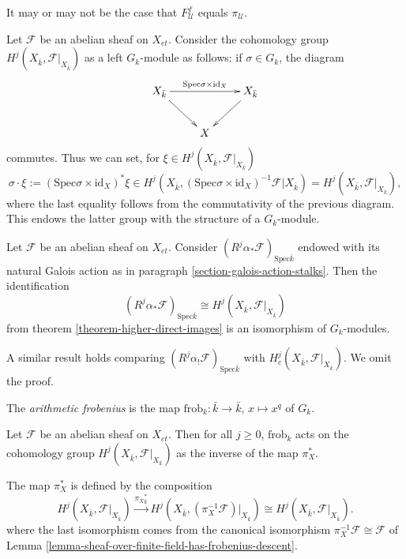 \begin{remark}
\label{remark-may-be-confusing}
It may or may not be the case that $F^f_\mathcal{U}$ equals $\pi_\mathcal{U}$.
\end{remark}

\noindent
Let $\mathcal{F}$ be an abelian sheaf on $X_{et}$. Consider the cohomology
group $H^j (X_{\bar k}, \mathcal{F}|_{X_{\bar k}})$ as a left $G_k$-module as
follows: if $\sigma \in G_k$, the diagram
$$
\xymatrix{
X_{\bar k} \ar[rd] \ar^{\text{Spec} \sigma \times \text{id}_X}[rr] && X_{\bar
k} \ar[ld]\\
& X
}
$$
commutes. Thus we can set, for $\xi \in H^j (X_{\bar k}, \mathcal{F}|_{X_{\bar
k}})$
$$
\sigma \cdot \xi := (\text{Spec} \sigma \times \text{id}_X)^*\xi \in
H^j(X_{\bar k}, (\text{Spec} \sigma \times \text{id}_X)^{-1}
\mathcal{F}|{X_{\bar k}})
= H^j (X_{\bar k}, \mathcal{F}|_{X_{\bar k}}),
$$
where the last equality follows from the commutativity of the previous diagram.
This endows the latter group with the structure of a $G_k$-module.

\begin{lemma}
\label{lemma-two-actions-agree}
Let $\mathcal{F}$ be an abelian sheaf on $X_{et}$. Consider
$(R^j\alpha_*\mathcal{F})_{\text{Spec} \bar k}$ endowed with its natural Galois
action as in paragraph \ref{section-galois-action-stalks}. Then the
identification
$$
(R^j\alpha_*\mathcal{F})_{\text{Spec} \bar k} \cong H^j (X_{\bar k},
\mathcal{F}|_{X_{\bar k}})
$$
from theorem \ref{theorem-higher-direct-images} is an isomorphism of
$G_k$-modules.
\end{lemma}

A similar result holds comparing $(R^j\alpha_!\mathcal{F})_{\text{Spec} \bar
k}$ with $H^j_c (X_{\bar k}, \mathcal{F}|_{X_{\bar k}})$. We omit the proof.

\begin{definition}
\label{definition-arithmetic-frobenius}
The {\it arithmetic frobenius} is the map
$\text{frob}_k : \bar k \to \bar k$, $x \mapsto x^q$ of $G_k$.
\end{definition}

\begin{theorem}
\label{theorem-geometric-arithmetic-inverse}
Let $\mathcal{F}$ be an abelian sheaf on $X_{et}$. Then for all $j\geq 0$,
$\text{frob}_k$ acts on the cohomology group $H^j(X_{\bar k},
\mathcal{F}|_{X_{\bar k}})$ as the inverse of the map $\pi_X^*$.
\end{theorem}

\noindent
The map $\pi_X^*$ is defined by the composition
$$
H^j(X_{\bar k}, \mathcal{F}|_{X_{\bar k}}) \xrightarrow{{\pi_X}_{\bar k}^*}
H^j(X_{\bar k}, (\pi_X^{-1} \mathcal{F})|_{X_{\bar k}}) \cong
H^j(X_{\bar k}, \mathcal{F}|_{X_{\bar k}}).
$$
where the last isomorphism comes from the canonical isomorphism
$\pi_X^{-1} \mathcal{F} \cong \mathcal{F}$ of
Lemma \ref{lemma-sheaf-over-finite-field-has-frobenius-descent}.

